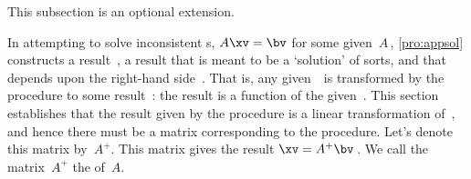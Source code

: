 This subsection is an optional extension.

In attempting to solve inconsistent s, 
\(A\xv=\bv\) for some given~\(A\)\,, \cref{pro:appsol} constructs a result~\xv, a result that is meant to be a `solution' of sorts, and that depends upon the right-hand side~\bv.
That is, any given~\bv\ is transformed by the procedure to some result~\xv: the result is a function of the given~\bv.
This section establishes that the result given by the procedure is a linear transformation of~\bv, and hence there must be a matrix corresponding to the procedure. 
Let's denote this matrix by~\(A^+\).
This matrix gives the result \(\xv=A^+\bv\)\,.
We call the matrix~\(A^+\) the  of~\(A\).

